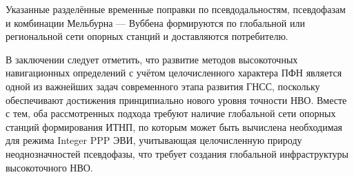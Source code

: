 \documentclass[14pt,a4paper,oneside]{extarticle}
\begin{document}
Указанные разделённые временные поправки по псевдодальностям, псевдофазам и комбинации Мельбурна –– Вуббена формируются по глобальной или региональной сети опорных станций и доставляются потребителю.

В заключении следует отметить, что развитие методов высокоточных навигационных определений с учётом целочисленного характера ПФН является одной из важнейших задач современного этапа развития ГНСС, поскольку обеспечивают достижения принципиально нового уровня точности НВО. Вместе с тем, оба рассмотренных подхода требуют наличие глобальной сети опорных станций формирования ИТНП, по которым может быть вычислена необходимая для режима Integer PPP ЭВИ, учитывающая целочисленную природу неоднозначностей псевдофазы, что требует создания глобальной инфраструктуры высокоточного НВО.
\end{document}
